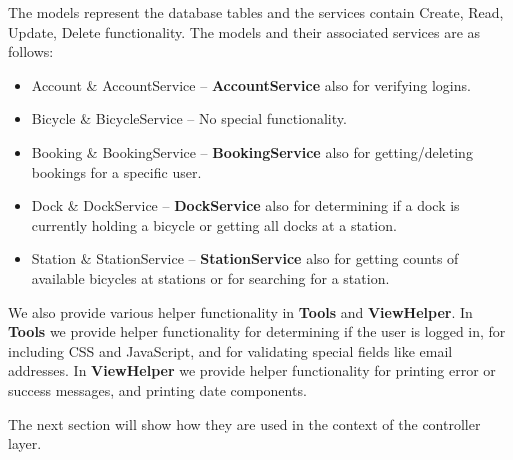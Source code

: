 The models represent the database tables and the services contain Create, Read, Update, Delete functionality. 
The models and their associated services are as follows:

\begin{itemize}
\item Account \& AccountService -- \textbf{AccountService} also for verifying logins.
\item Bicycle \& BicycleService -- No special functionality.
\item Booking \& BookingService -- \textbf{BookingService} also for getting/deleting bookings for a specific user.
\item Dock \& DockService -- \textbf{DockService} also for determining if a dock is currently holding a bicycle or getting all docks at a station.
\item Station \& StationService -- \textbf{StationService} also for getting counts of available bicycles at stations or for searching for a station.
\end{itemize}

We also provide various helper functionality in \textbf{Tools} and \textbf{ViewHelper}. 
In \textbf{Tools} we provide helper functionality for determining if the user is logged in, for including CSS and JavaScript, and for validating special fields like email addresses.
In \textbf{ViewHelper} we provide helper functionality for printing error or success messages, and printing date components.

 The next section will show how they are used in the context of the controller layer.